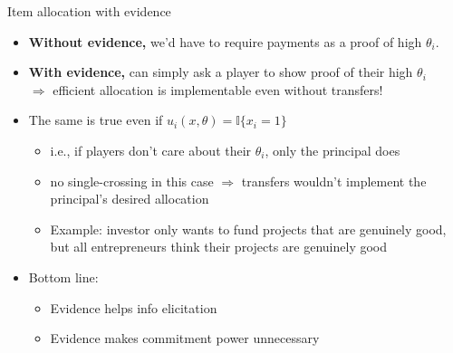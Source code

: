 \documentclass[english,10pt
,aspectratio=169
]{beamer}
\begin{document}
\begin{frame}{Item allocation with evidence}
\begin{itemize}
	\item \textbf{Without evidence,} we'd have to require payments as a proof of high $\theta_i$.
	\item \textbf{With evidence,} can simply ask a player to show proof of their high $\theta_i$ 
	\\ $\Rightarrow$ efficient allocation is implementable even without transfers!
	\item The same is true even if \alert{$u_i(x,\theta) = \mathbb{I}\{x_i=1\}$}
	\begin{itemize}
		\item i.e., if players don't care about their $\theta_i$, only the principal does
		\item no single-crossing in this case $\Rightarrow$ transfers wouldn't implement the principal's desired allocation
		\item Example: investor only wants to fund projects that are genuinely good, but all entrepreneurs think their projects are genuinely good
	\end{itemize}
	\pause \bigskip 
	\item Bottom line: 
	\begin{itemize}
		\item Evidence helps info elicitation
		\item Evidence makes commitment power unnecessary
	\end{itemize}
\end{itemize}
\end{frame}
\end{document}
